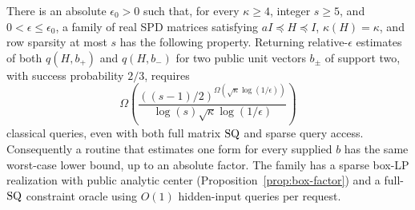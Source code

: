 \begin{theorem}\label{thm:clock-lower}
There is an absolute $\epsilon_0>0$ such that, for every $\kappa\geq4$,
integer $s\geq5$, and $0<\epsilon\leq\epsilon_0$, a family of real SPD
matrices satisfying $aI\preceq H\preceq I$, $\kappa(H)=\kappa$, and
row sparsity at most $s$ has the following property. Returning
relative-$\epsilon$ estimates of both $q(H,b_+)$ and $q(H,b_-)$ for two
public unit vectors $b_\pm$ of support two, with success probability
$2/3$, requires
\begin{equation}\label{eq:clock-lower}
 \Omega\left(
 \frac{((s-1)/2)^{\Omega(\sqrt\kappa\log(1/\epsilon))}}
 {\log(s)\sqrt\kappa\log(1/\epsilon)}\right)
\end{equation}
classical queries, even with both full matrix $\mathrm{SQ}$ and sparse query
access. Consequently a routine that estimates one form for every
supplied $b$ has the same worst-case lower bound, up to an absolute
factor. The family has a sparse box-LP realization with public analytic center
(Proposition~\ref{prop:box-factor}) and a full-$\mathrm{SQ}$ constraint oracle
using $O(1)$ hidden-input queries per request.
\end{theorem}
